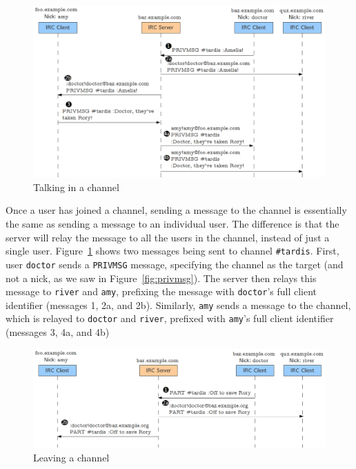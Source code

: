 \documentclass[10pt]{article}
\begin{document}
\begin{figure}
\begin{center}
\includegraphics[width=1\textwidth]{channel_privmsg.png}
\caption{Talking in a channel}
\label{fig:channel_privmsg}
\end{center}
\end{figure}

Once a user has joined a channel, sending a message to the channel is essentially the same as sending a message to an individual user. The difference is that the server will relay the message to all the users in the channel, instead of just a single user. Figure~\ref{fig:channel_privmsg} shows two messages being sent to channel \texttt{\#tardis}. First, user \texttt{doctor} sends a \texttt{PRIVMSG} message, specifying the channel as the target (and not a nick, as we saw in Figure~\ref{fig:privmsg}). The server then relays this message to \texttt{river} and \texttt{amy}, prefixing the message with \texttt{doctor}'s full client identifier (messages 1, 2a, and 2b). Similarly, \texttt{amy} sends a message to the channel, which is relayed to \texttt{doctor} and \texttt{river}, prefixed with \texttt{amy}'s full client identifier (messages 3, 4a, and 4b)

\begin{figure}
\begin{center}
\includegraphics[width=1\textwidth]{channel_part.png}
\caption{Leaving a channel}
\label{fig:channel_part}
\end{center}
\end{figure}
\end{document}
